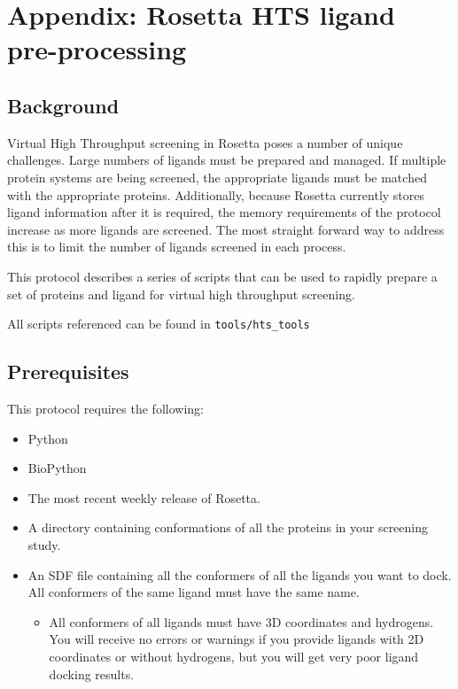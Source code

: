 \chapter{Appendix: Rosetta HTS ligand pre-processing}
\label{chap:hts_preprocess}
\section{Background}

Virtual High Throughput screening in Rosetta poses a number of unique challenges.
Large numbers of ligands must be prepared and managed.
If multiple protein systems are being screened, the appropriate ligands must be matched with the appropriate proteins. 
Additionally, because Rosetta currently stores ligand information after it is required, the memory requirements of the protocol increase as more ligands are screened.
The most straight forward way to address this is to limit the number of ligands screened in each process.

This protocol describes a series of scripts that can be used to rapidly prepare a set of proteins and ligand for virtual high throughput screening.

All scripts referenced can be found in \texttt{tools/hts\_tools}

\section{Prerequisites}

This protocol requires the following:

\begin{itemize}
\item Python
\item BioPython
\item The most recent weekly release of Rosetta.
\item A directory containing conformations of all the proteins in your screening study.
\item An SDF file containing all the conformers of all the ligands you want to dock. All conformers of the same ligand must have the same name.
	\begin{itemize}
	\item All conformers of all ligands must have 3D coordinates and hydrogens.
	You will receive no errors or warnings if you provide ligands with 2D coordinates or without hydrogens, but you will get very poor ligand docking results.
	\end{itemize}
\end{itemize}

